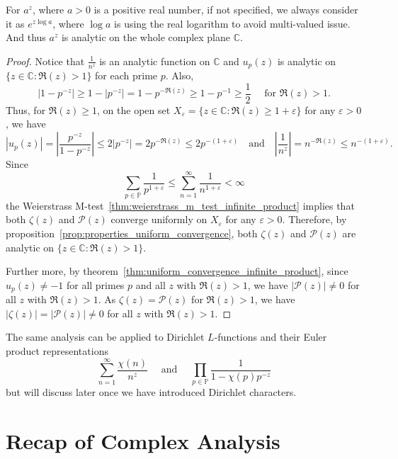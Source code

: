 \documentclass{elegantbook}
\begin{document}
\begin{note}
  For $a^{z}$, where $a>0$ is a positive real number, if not specified, we always consider it as $e^{z\log a}$, where $\log a$ is using the real logarithm to avoid multi-valued issue. And thus $a^{z}$ is analytic on the whole complex plane $\mathbb{C}$.
\end{note}

\begin{proof}
  Notice that $\frac{1}{n^z}$ is an analytic function on $\mathbb{C}$ and $u_p(z)$ is analytic on $\{z\in\mathbb{C}:\Re(z)>1\}$ for each prime $p$. Also, 
  \[
    |1-p^{-z}| \geq 1 - |p^{-z}| = 1 - p^{-\Re(z)} \geq 1 - p^{-1} \geq \frac12 \quad \text{ for } \Re(z) > 1.
  \]
  Thus, for $\Re(z) \geq 1$, on the open set $X_{\varepsilon}=\{z\in\mathbb{C}:\Re(z)\geq1+\varepsilon\}$ for any $\varepsilon>0$, we have
  \[
    |u_p(z)| = \left|\frac{p^{-z}}{1-p^{-z}}\right| \leq 2 |p^{-z}| = 2 p^{-\Re(z)} \leq 2 p^{-(1+\varepsilon)} \quad \text{and} \quad \left|\frac{1}{n^z}\right| = n^{-\Re(z)} \leq n^{-(1+\varepsilon)}.
  \]
  Since
  \[
    \sum_{p\in\mathbb{P}} \frac{1}{p^{1+\varepsilon}} \leq \sum_{n=1}^{\infty} \frac{1}{n^{1+\varepsilon}} < \infty
  \]
  the Weierstrass M-test~\ref{thm:weierstrass_m_test_infinite_product} implies that both $\zeta(z)$ and $\mathcal{P}(z)$ converge uniformly on $X_{\varepsilon}$ for any $\varepsilon>0$. Therefore, by proposition~\ref{prop:properties_uniform_convergence}, both $\zeta(z)$ and $\mathcal{P}(z)$ are analytic on $\{z\in\mathbb{C}:\Re(z)>1\}$.

  Further more, by theorem~\ref{thm:uniform_convergence_infinite_product}, since $u_p(z) \ne -1$ for all primes $p$ and all $z$ with $\Re(z)>1$, we have $|\mathcal{P}(z)| \ne 0$ for all $z$ with $\Re(z)>1$. As $\zeta(z) = \mathcal{P}(z)$ for $\Re(z)>1$, we have $|\zeta(z)| = |\mathcal{P}(z)| \ne 0$ for all $z$ with $\Re(z)>1$.
\end{proof}

\begin{note}
  The same analysis can be applied to Dirichlet $L$-functions and their Euler product representations
  \[
    \sum_{n=1}^{\infty} \frac{\chi(n)}{n^z} \quad \text{ and } \quad \prod_{p \in \mathbb{P}} \frac{1}{1 - \chi(p) p^{-z}}
  \]
  but will discuss later once we have introduced Dirichlet characters.
\end{note}

\section{Recap of Complex Analysis}
\end{document}
